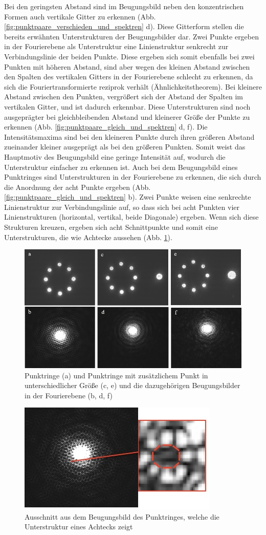 Bei den geringsten Abstand sind im Beugungsbild neben den konzentrischen Formen auch vertikale Gitter zu erkennen (Abb. \ref{fig:punktpaare_verschieden_und_spektren} d). Diese Gitterform stellen die bereits erwähnten Unterstrukturen der Beugungsbilder dar. Zwei Punkte ergeben in der Fourierebene als
Unterstruktur eine Linienstruktur senkrecht zur Verbindungslinie der beiden Punkte. Diese ergeben sich somit ebenfalls bei zwei Punkten mit höheren Abstand, sind aber wegen des
kleinen Abstand zwischen den Spalten des vertikalen Gitters in der Fourierebene schlecht zu erkennen, da sich die Fouriertransformierte reziprok verhält (Ähnlichkeitstheorem). Bei
kleinere Abstand zwischen den Punkten, vergrößert sich der Abstand der Spalten im vertikalen Gitter, und ist dadurch erkennbar. Diese Unterstrukturen sind noch ausgeprägter bei gleichbleibenden Abstand und kleinerer Größe der Punkte zu erkennen (Abb. \ref{fig:punktpaare_gleich_und_spektren} d, f). Die
Intensitätsmaxima sind bei den kleineren Punkte durch ihren größeren Abstand zueinander kleiner ausgeprägt als bei den größeren Punkten. Somit weist das Hauptmotiv des Beugungsbild eine geringe Intensität auf, wodurch die Unterstruktur einfacher zu erkennen
ist.
Auch bei dem Beugungsbild eines Punktringes sind Unterstrukturen in der Fourierebene zu erkennen, die sich durch die Anordnung der acht Punkte ergeben (Abb. \ref{fig:punktpaare_gleich_und_spektren} b). Zwei Punkte weisen eine senkrechte Linienstruktur zur Verbindungslinie auf, so dass sich bei acht Punkten vier Linienstrukturen (horizontal, vertikal, beide Diagonale) ergeben. Wenn sich diese Strukturen kreuzen, ergeben sich acht Schnittpunkte und somit eine Unterstrukturen, die wie Achtecke aussehen (Abb. \ref{fig:punktringe_und_spektrum}).

\begin{figure}[h]
	\centering
	\includegraphics[width=0.10\linewidth]{Regina/abb17}
	\caption[Punktringe mit Fourierspektren]{Punktringe (a) und Punktringe mit zusätzlichem Punkt in unterschiedlicher Größe (c, e) und die dazugehörigen Beugungsbilder in der Fourierebene (b, d, f)}
	\label{fig:punktringe_und_spektrum}
\end{figure}

\begin{figure}[h]
	\centering
	\includegraphics[width=0.10\linewidth]{Regina/abb18}
	\caption[Punktringe Beugungsbild Ausschnitt]{Ausschnitt aus dem Beugungsbild des Punktringes, welche die Unterstruktur eines Achtecks zeigt}
	\label{fig:punktring_ausschnitt}
\end{figure}

